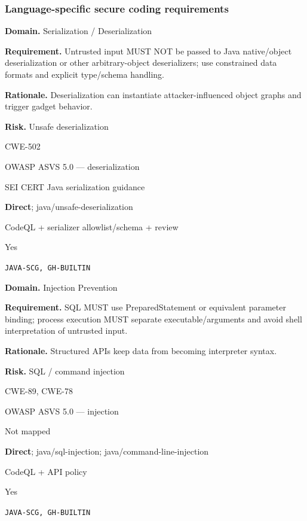 \documentclass[10pt,letterpaper]{article}
\newcommand{\prioritybadge}[2]{\tcbox[on line,boxrule=0pt,arc=1.2mm,boxsep=0.7mm,left=1mm,right=1mm,top=0.4mm,bottom=0.4mm,colback=#2!12,coltext=#2]{\scriptsize\bfseries #1}}
\begin{document}
\subsubsection*{Language-specific secure coding requirements}

\begin{rulebox}[title={\texttt{SCS-JAVA-DESER-001} \hfill \prioritybadge{Critical Control}{Critical}}]
\textbf{Domain.} Serialization / Deserialization

\textbf{Requirement.} Untrusted input MUST NOT be passed to Java native/object deserialization or other arbitrary-object deserializers; use constrained data formats and explicit type/schema handling.

\textbf{Rationale.} Deserialization can instantiate attacker-influenced object graphs and trigger gadget behavior.

\textbf{Risk.} Unsafe deserialization

\begin{description}[leftmargin=2.65cm,labelwidth=2.3cm,style=nextline,itemsep=1pt,topsep=3pt]
  \item[CWE] CWE-502
  \item[OWASP] OWASP ASVS 5.0 --- deserialization
  \item[CERT] SEI CERT Java serialization guidance
  \item[CodeQL] \textbf{Direct}; java/unsafe-deserialization
  \item[Enforcement] CodeQL + serializer allowlist/schema + review
  \item[Automation] Yes
  \item[Sources] \texttt{JAVA-SCG, GH-BUILTIN}
\end{description}
\end{rulebox}

\begin{rulebox}[title={\texttt{SCS-JAVA-INJ-001} \hfill \prioritybadge{Critical Control}{Critical}}]
\textbf{Domain.} Injection Prevention

\textbf{Requirement.} SQL MUST use PreparedStatement or equivalent parameter binding; process execution MUST separate executable/arguments and avoid shell interpretation of untrusted input.

\textbf{Rationale.} Structured APIs keep data from becoming interpreter syntax.

\textbf{Risk.} SQL / command injection

\begin{description}[leftmargin=2.65cm,labelwidth=2.3cm,style=nextline,itemsep=1pt,topsep=3pt]
  \item[CWE] CWE-89, CWE-78
  \item[OWASP] OWASP ASVS 5.0 --- injection
  \item[CERT] Not mapped
  \item[CodeQL] \textbf{Direct}; java/sql-injection; java/command-line-injection
  \item[Enforcement] CodeQL + API policy
  \item[Automation] Yes
  \item[Sources] \texttt{JAVA-SCG, GH-BUILTIN}
\end{description}
\end{rulebox}
\end{document}

